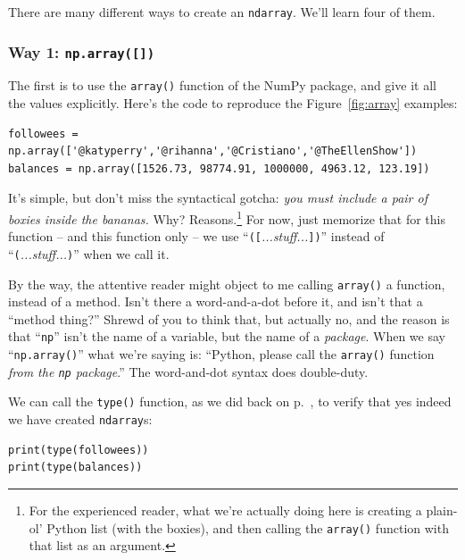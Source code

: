 There are many different ways to create an \texttt{ndarray}. We'll learn four
of them.

\subsubsection{Way 1: \texttt{np.array([])}}

The first is to use the \texttt{array()} function of the NumPy package, and
give it all the values explicitly. Here's the code to reproduce the
Figure~\ref{fig:array} examples:

\begin{Verbatim}[fontsize=\scriptsize,samepage=true,frame=single,framesep=3mm]
followees = np.array(['@katyperry','@rihanna','@Cristiano','@TheEllenShow'])
balances = np.array([1526.73, 98774.91, 1000000, 4963.12, 123.19])
\end{Verbatim}

It's simple, but don't miss the syntactical gotcha: \textit{you must include a
pair of boxies inside the bananas.} Why? Reasons.\footnote{For the experienced
reader, what we're actually doing here is creating a plain-ol' Python list
(with the boxies), and then calling the \texttt{array()} function with that
list as an argument.} For now, just memorize that for this function -- and this
function only -- we use ``\texttt{([}\textsl{...stuff...}\texttt{])}'' instead
of ``\texttt{(}\textsl{...stuff...}\texttt{)}'' when we call it.

By the way, the attentive reader might object to me calling \texttt{array()} a
function, instead of a method. Isn't there a word-and-a-dot before it, and
isn't that a ``method thing?'' Shrewd of you to think that, but actually no,
and the reason is that ``\texttt{np}'' isn't the name of a variable, but the
name of a \textit{package}. When we say ``\texttt{np.array()}'' what we're
saying is: ``Python, please call the \texttt{array()} function \textit{from the
\texttt{np} package}.'' The word-and-dot syntax does double-duty.

We can call the \texttt{type()} function, as we did back on
p.~\pageref{typeFunction}, to verify that yes indeed we have created
\texttt{ndarray}s:

\begin{Verbatim}[fontsize=\small,samepage=true,frame=single,framesep=3mm]
print(type(followees))
print(type(balances))
\end{Verbatim}


